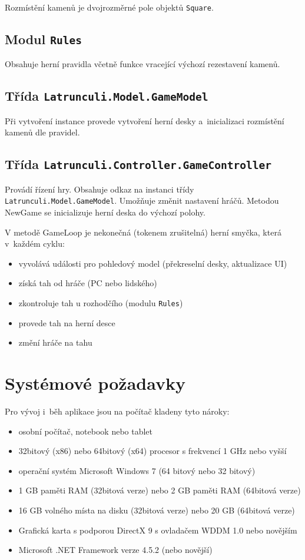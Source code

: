\documentclass[12pt]{article}
\begin{document}
Rozmístění kamenů je dvojrozměrné pole objektů \texttt{Square}.

\subsection{Modul \texttt{Rules}}
Obsahuje herní pravidla včetně funkce vracející výchozí rezestavení kamenů.

\subsection{Třída \texttt{Latrunculi.Model.GameModel}}
Při vytvoření instance provede vytvoření herní desky a~inicializaci rozmístění kamenů dle pravidel.

\subsection{Třída \texttt{Latrunculi.Controller.GameController}}
Provádí řízení hry. Obsahuje odkaz na instanci třídy \texttt{Latrunculi.Model.GameModel}.
Umožňuje změnit nastavení hráčů. Metodou NewGame se inicializuje herní deska do výchozí polohy.

V metodě GameLoop je nekonečná (tokenem zrušitelná) herní smyčka, která v~každém cyklu:
	\begin{itemize}  
		\item vyvolává události pro pohledový model (překreselní desky, aktualizace UI)
		\item získá tah od hráče (PC nebo lidského)
		\item zkontroluje tah u rozhodčího (modulu \texttt{Rules})
		\item provede tah na herní desce
		\item změní hráče na tahu
	\end{itemize}

\section{Systémové požadavky}
Pro vývoj i~běh aplikace jsou na počítač kladeny tyto nároky:
	\begin{itemize}  
		\item osobní počítač, notebook nebo tablet
		\item 32bitový (x86) nebo 64bitový (x64) procesor s frekvencí 1 GHz nebo vyšší
		\item operační systém Microsoft Windows 7 (64 bitový nebo 32 bitový)
		\item 1 GB paměti RAM (32bitová verze) nebo 2 GB paměti RAM (64bitová verze)
		\item 16 GB volného místa na disku (32bitová verze) nebo 20 GB (64bitová verze)
		\item Grafická karta s podporou DirectX 9 s ovladačem WDDM 1.0 nebo novějším
		\item Microsoft .NET Framework verze 4.5.2 (nebo novější)
	\end{itemize}
\end{document}
